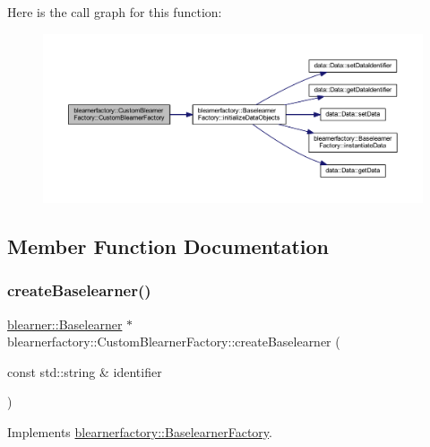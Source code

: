Here is the call graph for this function\+:\nopagebreak
\begin{figure}[H]
\begin{center}
\leavevmode
\includegraphics[width=350pt]{classblearnerfactory_1_1_custom_blearner_factory_a1a006cb772dc79cbcbcab810f5431b2c_cgraph}
\end{center}
\end{figure}


\subsection{Member Function Documentation}
\mbox{\label{classblearnerfactory_1_1_custom_blearner_factory_aad915d1ac58a323d1584d27f8cdace56}} 
\subsubsection{\texorpdfstring{create\+Baselearner()}{createBaselearner()}}
{\footnotesize\ttfamily \mbox{\hyperlink{classblearner_1_1_baselearner}{blearner\+::\+Baselearner}} $\ast$ blearnerfactory\+::\+Custom\+Blearner\+Factory\+::create\+Baselearner (\begin{DoxyParamCaption}\item[{const std\+::string \&}]{identifier }\end{DoxyParamCaption})\hspace{0.3cm}{\ttfamily [virtual]}}



Implements \mbox{\hyperlink{classblearnerfactory_1_1_baselearner_factory_ac3584a20a84834099a15908690b837bb}{blearnerfactory\+::\+Baselearner\+Factory}}.

